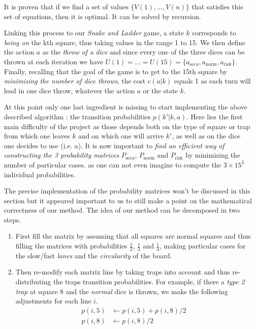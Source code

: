 It is proven that if we find a set of values $\{V(1), \dots, V(n)\}$
that satisfies this set of equations, then it is optimal. 
It can be solved by recursion.

Linking this process to our \textit{Snake and Ladder} game,
a state $k$ corresponds to \emph{being on} the kth square,
thus taking values in the range 1 to 15.
We then define the action $a$ as the \emph{throw of a dice}
and since every one of the three dices can be thrown at each
iteration we have $U(1) = \dots = U(15) = \{a_{\text{secu}},
a_{\text{norm}}, a_{\text{risk}}\}$.
Finally, recalling that the goal of the game is to get to
the 15th square by \emph{minimizing the number of dice throws},
the cost $c(a|k)$ equals 1 as each turn will lead in one dice
throw, whatever the action $a$ or the state $k$. 

At this point only one last ingredient is missing to start implementing
the above described algorithm : the transition probabilities $p(k'|k,a)$.
Here lies the first main difficulty of the project as those depends
both on the type of square or trap from which one leaves $k$ and
on which one will arrive $k'$, as well as on the dice one
decides to use (i.e. $a$).
It is now important to \emph{find an efficient way of constructing
the 3 probability matrices} $P_{\text{secu}}$, $P_{\text{norm}}$
and $P_{\text{risk}}$ by minimizing the number of particular cases,
as one can not even imagine to compute the $3\times 15^2$ individual probabilities.

The precise implementation of the probability matrices won't be
discussed in this section but it appeared important to us
to still make a point on the mathematical correctness of our method.
The idea of our method can be decomposed in two steps.
\begin{enumerate}
  \item First fill the matrix by assuming that
  all squares are normal squares and thus filling the matrices
  with probabilities $\frac{1}{2}$, $\frac{1}{3}$ and $\frac{1}{4}$,
  making particular cases for the slow/fast \emph{lanes}
  and the \emph{circularity} of the board.
  \item Then re-modify each matrix line by taking traps into account
  and thus re-distributing the traps transition probabilities.
  For example, if there a \emph{type 2 trap} at square 8 
  and the \emph{normal} dice is thrown, we make the following adjustments
  for each line $i$.
  \begin{align*}
    p(i,5) &\leftarrow p(i,5) + p(i,8)/2 \\
     p(i,8) &\leftarrow p(i,8)/2
  \end{align*}
\end{enumerate}


